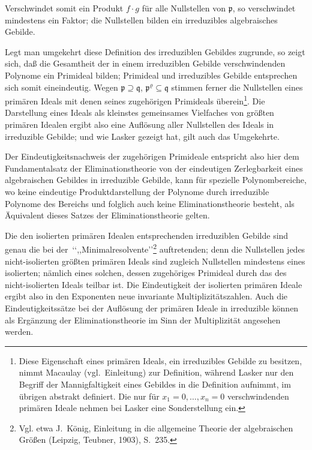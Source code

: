 \documentclass[fontsize=10pt,paper=a5,pagesize,headings=small]{scrbook}
\newcommand{\ideal}[1]{\mathfrak{#1}}
\theoremstyle{plain}
\begin{document}
Verschwindet somit ein Produkt $f \cdot g$ für alle Nullstellen von
$\ideal{p}$, so verschwindet mindestens ein Faktor; die Nullstellen bilden
ein irreduzibles algebraisches Gebilde.

Legt man umgekehrt diese Definition des irreduziblen Gebildes zugrunde,
so zeigt sich, daß die Gesamtheit der in einem irreduziblen Gebilde
verschwindenden Polynome ein Primideal bilden; Primideal und irreduzibles
Gebilde entsprechen sich somit eineindeutig. Wegen $\ideal{p} \supseteq \ideal{q}$,
$\ideal{p}^\varrho \subseteq \ideal{q}$ stimmen ferner die Nullstellen eines primären
Ideals mit denen seines zugehörigen Primideals überein\footnote{Diese
Eigenschaft eines primären Ideals, ein irreduzibles Gebilde zu besitzen,
nimmt Macaulay (vgl.\ Einleitung) zur Definition, während Lasker nur den
Begriff der Mannigfaltigkeit eines Gebildes in die Definition aufnimmt, im
übrigen abstrakt definiert. Die nur für $x_1 = 0,\dots,x_n = 0$ verschwindenden
primären Ideale nehmen bei Lasker eine Sonderstellung ein.}.
Die Darstellung eines Ideals als kleinstes gemeinsames Vielfaches von
größten primären Idealen ergibt also eine Auflösung aller Nullstellen des
Ideals in irreduzible Gebilde; und wie Lasker gezeigt hat, gilt auch das
Umgekehrte.

Der Eindeutigkeitsnachweis der zugehörigen Primideale entspricht also
hier dem Fundamentalsatz der Eliminationstheorie von der eindeutigen
Zerlegbarkeit eines algebraischen Gebildes in irreduzible Gebilde, kann für
spezielle Polynombereiche, wo keine eindeutige Produktdarstellung der
Polynome durch irreduzible Polynome des Bereichs und folglich auch keine
Eliminationstheorie besteht, als Äquivalent dieses Satzes der Eliminations\-theorie gelten.

Die den isolierten primären Idealen entsprechenden irreduziblen Gebilde
sind genau die bei der \,`\!`,,Minimalresolvente\!''\footnote{Vgl. etwa
J.~König, Einleitung in die allgemeine Theorie der algebraischen Größen
(Leipzig, Teubner, 1903), S.~235.} auftretenden; denn die Nullstellen jedes
nicht-isolierten größten primären Ideals sind zugleich Nullstellen mindestens
eines isolierten; nämlich eines solchen, dessen zugehöriges Primideal durch
das des nicht-isolierten Ideals teilbar ist. Die Eindeutigkeit der isolierten
primären Ideale ergibt also in den Exponenten neue invariante Multiplizitätszahlen.
Auch die Eindeutigkeitssätze bei der Auflösung der primären Ideale in
irreduzible können als Ergänzung der Eliminationstheorie im Sinn der
Multiplizität angesehen werden.
\end{document}
